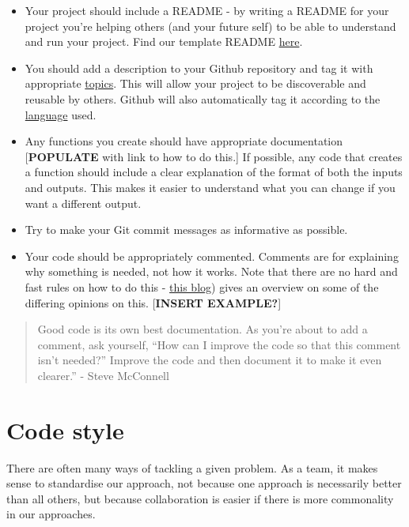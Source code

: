 \documentclass[]{book}
\begin{document}
\begin{itemize}
\item
  Your project should include a README - by writing a README for your project you're helping others (and your future self) to be able to understand and run your project. Find our template README \href{https://github.com/moj-analytical-services/our-coding-standards/blob/master/README_template.md}{here}.
\item
  You should add a description to your Github repository and tag it with appropriate \href{https://help.github.com/en/github/administering-a-repository/classifying-your-repository-with-topics}{topics}. This will allow your project to be discoverable and reusable by others. Github will also automatically tag it according to the \href{https://help.github.com/en/github/creating-cloning-and-archiving-repositories/about-repository-languages}{language} used.
\item
  Any functions you create should have appropriate documentation {[}\textbf{POPULATE} with link to how to do this.{]} If possible, any code that creates a function should include a clear explanation of the format of both the inputs and outputs. This makes it easier to understand what you can change if you want a different output.
\item
  Try to make your Git commit messages as informative as possible.
\item
  Your code should be appropriately commented. Comments are for explaining why something is needed, not how it works. Note that there are no hard and fast rules on how to do this - \href{https://blog.ndepend.com/correct-way-comment-code/}{this blog}) gives an overview on some of the differing opinions on this.
  {[}\textbf{INSERT EXAMPLE?}{]}
\end{itemize}

\begin{quote}
Good code is its own best documentation. As you're about to add a comment, ask yourself, ``How can I improve the code so that this comment isn't needed?'' Improve the code and then document it to make it even clearer.'' - Steve McConnell
\end{quote}

\hypertarget{style}{%
\section{Code style}\label{style}}

There are often many ways of tackling a given problem. As a team, it makes sense to standardise our approach, not because one approach is necessarily better than all others, but because collaboration is easier if there is more commonality in our approaches.
\end{document}
